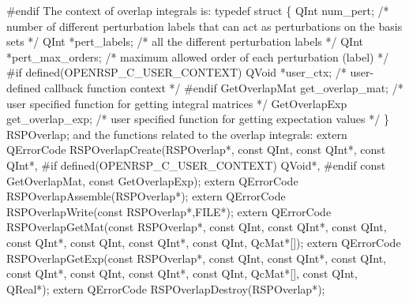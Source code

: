 #endif
\nwendcode{}The context of overlap integrals is:
\nwenddocs{}\endmoddef
typedef struct \{
    QInt num_pert;                  /* number of different perturbation labels that
                                       can act as perturbations on the basis sets */
    QInt *pert_labels;              /* all the different perturbation labels */
    QInt *pert_max_orders;          /* maximum allowed order of each perturbation (label) */
#if defined(OPENRSP_C_USER_CONTEXT)
    QVoid *user_ctx;                /* user-defined callback function context */
#endif
    GetOverlapMat get_overlap_mat;  /* user specified function for getting integral matrices */
    GetOverlapExp get_overlap_exp;  /* user specified function for getting expectation values */
\} RSPOverlap;
\nwendcode{}and the functions related to the overlap integrals:
\nwenddocs{}\endmoddef
extern QErrorCode RSPOverlapCreate(RSPOverlap*,
                                   const QInt,
                                   const QInt*,
                                   const QInt*,
#if defined(OPENRSP_C_USER_CONTEXT)
                                   QVoid*,
#endif
                                   const GetOverlapMat,
                                   const GetOverlapExp);
extern QErrorCode RSPOverlapAssemble(RSPOverlap*);
extern QErrorCode RSPOverlapWrite(const RSPOverlap*,FILE*);
extern QErrorCode RSPOverlapGetMat(const RSPOverlap*,
                                   const QInt,
                                   const QInt*,
                                   const QInt,
                                   const QInt*,
                                   const QInt,
                                   const QInt*,
                                   const QInt,
                                   QcMat*[]);
extern QErrorCode RSPOverlapGetExp(const RSPOverlap*,
                                   const QInt,
                                   const QInt*,
                                   const QInt,
                                   const QInt*,
                                   const QInt,
                                   const QInt*,
                                   const QInt,
                                   QcMat*[],
                                   const QInt,
                                   QReal*);
extern QErrorCode RSPOverlapDestroy(RSPOverlap*);
\nwendcode{}\nwdocspar

